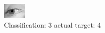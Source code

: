 \begin{figure}[h!]
\begin{center}
\includegraphics[width=0.60\columnwidth]{figures/ID2880_class_3_target_4.png}
\end{center}
\caption{ Classification: 3 actual target: 4}
\label{fig:ID2880_class_3_target_4}
\end{figure}
